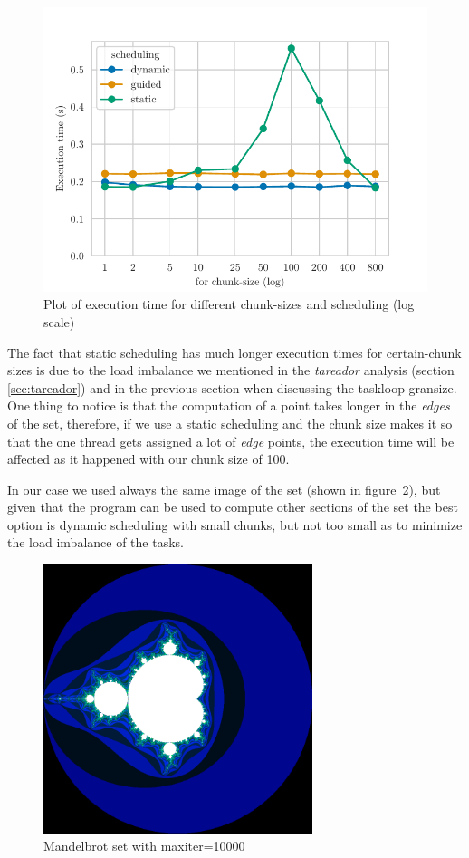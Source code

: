 \begin{figure}[H]
    \centering
    \includegraphics{plots/for-scheduling_log.pdf}
    \caption{Plot of execution time for different chunk-sizes and scheduling (log scale)}
    \label{fig:for_log} 
\end{figure}

The fact that static scheduling has much longer execution times for certain-chunk sizes is due to the load imbalance
we mentioned in the \emph{tareador} analysis (section \ref{sec:tareador}) and in the previous section when
discussing the taskloop gransize.
One thing to notice is that the computation of a point takes longer in the \emph{edges}
of the set, therefore, if we use a static scheduling and the chunk size makes it so that the one thread gets assigned
a lot of \emph{edge} points, the execution time will be affected as it happened with our chunk size of 100. 

In our case we used always the same image of the set (shown in figure~\ref{fig:set}), but given that the program can be
used to compute other sections of the set the best option is dynamic scheduling with small chunks, but not too small
as to minimize the load imbalance of the tasks.

\begin{figure}[H]
    \centering
    \includegraphics[width=0.7\textwidth]{images/set.png}
    \caption{Mandelbrot set with maxiter=10000}
    \label{fig:set} 
\end{figure}

